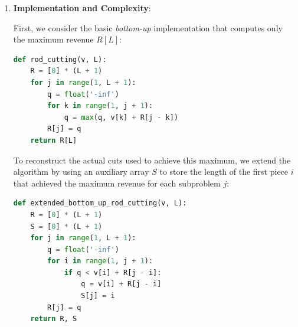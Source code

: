 \documentclass[12pt,a4paper]{report}
\begin{document}
\begin{enumerate}
\begin{center}
\end{center}

  \item[(c)] \textbf{Implementation and Complexity}:

First, we consider the basic \textit{bottom-up} implementation that computes only the maximum revenue $R[L]$:

\begin{lstlisting}[language=Python, caption={Basic Bottom-Up Rod Cutting}]
def rod_cutting(v, L):
    R = [0] * (L + 1)
    for j in range(1, L + 1):
        q = float('-inf')
        for k in range(1, j + 1):
            q = max(q, v[k] + R[j - k])
        R[j] = q
    return R[L]
\end{lstlisting}

To reconstruct the actual cuts used to achieve this maximum, we extend the algorithm by using an auxiliary array $S$ to store the length of the first piece $i$ that achieved the maximum revenue for each subproblem $j$:

\begin{lstlisting}[language=Python, caption={Extended Bottom-Up Rod Cutting}]
def extended_bottom_up_rod_cutting(v, L):
    R = [0] * (L + 1)
    S = [0] * (L + 1)
    for j in range(1, L + 1):
        q = float('-inf')
        for i in range(1, j + 1):
            if q < v[i] + R[j - i]:
                q = v[i] + R[j - i]
                S[j] = i
        R[j] = q
    return R, S
\end{lstlisting}




\end{enumerate}
\end{document}
